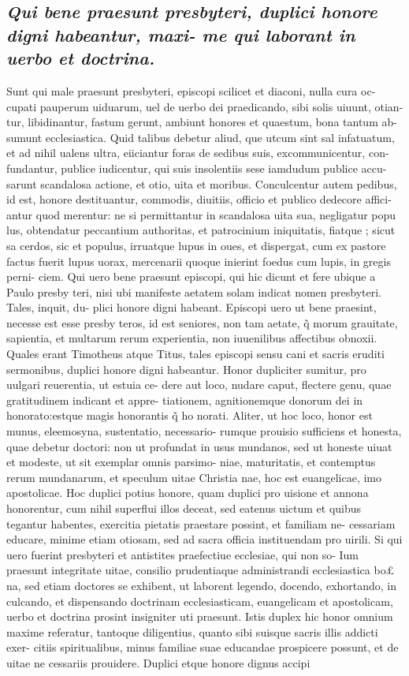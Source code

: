 \documentclass{article}
\begin{document}
\begin{pages}
\subsection*{\textit{Qui bene praesunt presbyteri, duplici honore digni habeantur, maxi- me qui laborant in uerbo et doctrina. }}\pstart Sunt qui male praesunt presbyteri, episcopi scilicet et diaconi, nulla cura oc- cupati pauperum uiduarum, uel de uerbo dei praedicando, sibi solis uiuunt, otian- tur, libidinantur, fastum gerunt, ambiunt honores et quaestum, bona tantum ab- sumunt ecclesiastica. Quid talibus debetur aliud, que utcum sint sal infatuatum, et ad nihil ualens ultra, eiiciantur foras de sedibus suis, excommunicentur, con- fundantur, publice iudicentur, qui suis insolentiis sese iamdudum publice accu- sarunt scandalosa actione, et otio, uita et moribus. Conculcentur autem pedibus, id est, honore destituantur, commodis, diuitiis, officio et publico dedecore affici- antur quod merentur: ne si permittantur in scandalosa uita sua, negligatur popu lus, obtendatur peccantium authoritas, et patrocinium iniquitatis, fiatque ; sicut sa cerdos, sic et populus, irruatque lupus in oues, et dispergat, cum ex pastore factus fuerit lupus uorax, mercenarii quoque inierint foedus cum lupis, in gregis perni- ciem. Qui uero bene praesunt episcopi, qui hic dicunt et fere ubique a Paulo presby teri, nisi ubi manifeste aetatem solam indicat nomen presbyteri. Tales, inquit, du- plici honore digni habeant. Episcopi uero ut bene praesint, necesse est esse presby teros, id est seniores, non tam aetate, q̃ morum grauitate, sapientia, et multarum rerum experientia, non iuuenilibus affectibus obnoxii. Quales erant Timotheus atque Titus, tales episcopi sensu cani et sacris eruditi sermonibus, duplici honore digni habeantur. Honor dupliciter sumitur, pro uulgari reuerentia, ut estuia ce- dere aut loco, nudare caput, flectere genu, quae gratitudinem indicant et appre- tiationem, agnitionemque donorum dei in honorato:estque magis honorantis q̃ ho norati. Aliter, ut hoc loco, honor est munus, eleemosyna, sustentatio, necessario- rumque prouisio sufficiens et honesta, quae debetur doctori: non ut profundat in usus mundanos, sed ut honeste uiuat et modeste, ut sit exemplar omnis parsimo- niae, maturitatis, et contemptus rerum mundanarum, et speculum uitae Christia nae, hoc est euangelicae, imo apostolicae. Hoc duplici potius honore, quam duplici pro uisione et annona honorentur, cum nihil superflui illos deceat, sed eatenus uictum et quibus tegantur habentes, exercitia pietatis praestare possint, et familiam ne- cessariam educare, minime etiam otiosam, sed ad sacra officia instituendam pro uirili. Si qui uero fuerint presbyteri et antistites praefectiue ecclesiae, qui non so- Ium praesunt integritate uitae, consilio prudentiaque administrandi ecclesiastica bo£ na, sed etiam doctores se exhibent, ut laborent legendo, docendo, exhortando, in culcando, et dispensando doctrinam ecclesiasticam, euangelicam et apostolicam, uerbo et doctrina prosint insigniter uti praesunt. Istis duplex hic honor omnium maxime referatur, tantoque diligentius, quanto sibi suisque sacris illis addicti exer- citiis spiritualibus, minus familiae suae educandae prospicere possunt, et de uitae ne cessariis prouidere. Duplici etque honore dignus accipi 
\end{pages}
\end{document}
